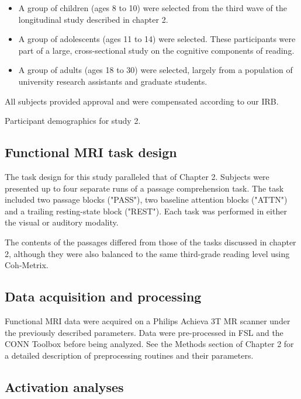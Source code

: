 \begin{itemize}
	\item A group of children (ages 8 to 10) were selected from the third wave of the longitudinal study described in chapter 2. 
	\item A group of adolescents (ages 11 to 14) were selected. These participants were part of a large, cross-sectional study on the cognitive components of reading.
	\item A group of adults (ages 18 to 30) were selected, largely from a population of university research assistants and graduate students.
\end{itemize}

All subjects provided approval and were compensated according to our IRB.

\begin{table}[t]
	\renewcommand{\tabcolsep}{0.09cm}
	\centering
	
	\caption{Participant demographics for study 2.}
	\label{table:ch3-participants}
\end{table}

\subsection{Functional MRI task design}

The task design for this study paralleled that of Chapter 2. Subjects were presented up to four separate runs of a passage comprehension task. The task included two passage blocks ("PASS"), two baseline attention blocks ("ATTN") and a trailing resting-state block ("REST"). Each task was performed in either the visual or auditory modality.

The contents of the passages differed from those of the tasks discussed in chapter 2, although they were also balanced to the same third-grade reading level using Coh-Metrix. 

\subsection{Data acquisition and processing}

Functional MRI data were acquired on a Philips Achieva 3T MR scanner under the previously described parameters. Data were pre-processed in FSL and the CONN Toolbox before being analyzed. See the Methods section of Chapter 2 for a detailed description of preprocessing routines and their parameters.

\subsection{Activation analyses}

